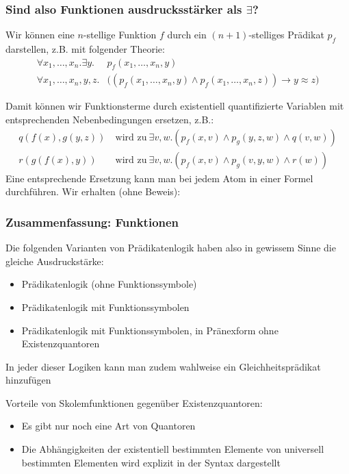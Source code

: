 \documentclass[aspectratio=1610,onlymath]{beamer}
\begin{document}
\begin{frame}\frametitle{Sind also Funktionen ausdrucksstärker als $\exists$?}
\pause

Wir können eine $n$-stellige Funktion $f$ durch ein $(n+1)$-stelliges Prädikat $p_f$
darstellen, z.B. mit folgender Theorie:
\begin{align*}
\forall x_1,\ldots, x_n.\exists y.&p_f(x_1,\ldots,x_n,y)\\
\forall x_1,\ldots, x_n,y,z.&\big((p_f(x_1,\ldots,x_n,y)\wedge p_f(x_1,\ldots,x_n,z))\to y\approx z\big)
\end{align*}\pause

Damit können wir Funktionsterme durch existentiell quantifizierte Variablen mit
entsprechenden Nebenbedingungen ersetzen, z.B.:
\begin{align*}
q(f(x),g(y,z)) &\ \text{wird zu}\ \exists v,w.(p_f(x,v)\wedge p_g(y,z,w)\wedge q(v,w))\\
r(g(f(x),y)) &\ \text{wird zu}\ \exists v,w.(p_f(x,v)\wedge p_g(v,y,w)\wedge r(w))
\end{align*}\pause
Eine entsprechende Ersetzung kann man bei jedem Atom in einer Formel durchführen. Wir erhalten (ohne Beweis):


\end{frame}

\begin{frame}\frametitle{Zusammenfassung: Funktionen}

Die folgenden Varianten von Prädikatenlogik haben also in gewissem Sinne die \alert{gleiche
Ausdruckstärke:}
\begin{itemize}
\item Prädikatenlogik (ohne Funktionssymbole)
\item Prädikatenlogik mit Funktionssymbolen
\item Prädikatenlogik mit Funktionssymbolen, in Pränexform ohne Existenzquantoren
\end{itemize}
In jeder dieser Logiken kann man zudem wahlweise ein Gleichheitsprädikat hinzufügen
\bigskip\pause

\alert{Vorteile von Skolemfunktionen gegenüber Existenzquantoren:}
\begin{itemize}
\item Es gibt nur noch eine Art von Quantoren
\item Die Abhängigkeiten der existentiell bestimmten Elemente von universell bestimmten Elementen wird explizit in der Syntax dargestellt
\end{itemize}


\end{frame}
\end{document}
